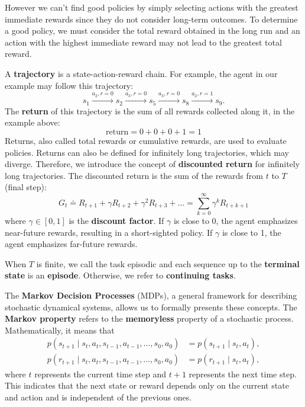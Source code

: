 However we can't find good policies
by simply selecting actions with the greatest immediate rewards
since they do not consider
long-term outcomes. To determine a good policy, we must consider the total
reward obtained in the long run and
an action with the highest immediate reward may not lead to
the greatest total reward.

A \textbf{trajectory} is a state-action-reward chain.
For example, the agent in our example may follow this trajectory:
\[ s_1 \xrightarrow{a_2, r=0} s_2 \xrightarrow{a_3, r=0} s_5 \xrightarrow{a_3, r=0} s_8 \xrightarrow{a_2, r=1} s_9. \]
The \textbf{return} of this trajectory is the sum of all rewards collected along it,
in the example above:
\[\text{return} = 0+0+0+1=1\]
Returns, also called total rewards or cumulative rewards,
are used to evaluate policies.
Returns can also be defined for infinitely long trajectories, which may diverge.
Therefore, we introduce the concept of \textbf{discounted return} for infinitely
long trajectories. The discounted return is the sum of the rewards from $t$ to $T$ (final step):
\begin{equation}
G_t \doteq R_{t+1} + \gamma R_{t+2} + \gamma^2 R_{t+3} + \ldots = \sum_{k=0}^{\infty} \gamma^k R_{t+k+1}
\end{equation}
where \( \gamma \in [0, 1] \) is the \textbf{discount factor}.
If \( \gamma \) is close to 0, the agent emphasizes near-future rewards,
resulting in a short-sighted policy. If \( \gamma \) is close to 1,
the agent emphasizes far-future rewards.

When $T$ is finite, we call the task episodic and each sequence
up to the \textbf{terminal state} is an \textbf{episode}. Otherwise, we refer
to \textbf{continuing tasks}.

The \textbf{Markov Decision Processes} (MDPs),
a general framework for describing stochastic dynamical systems,
allows us to formally presents these concepts.
The \textbf{Markov property} refers to the \textbf{memoryless} property of a stochastic process. Mathematically, it means that
\begin{equation}
\begin{aligned}
p(s_{t+1} \mid s_t, a_t, s_{t-1}, a_{t-1}, \ldots, s_0, a_0) &= p(s_{t+1} \mid s_t, a_t), \\
p(r_{t+1} \mid s_t, a_t, s_{t-1}, a_{t-1}, \ldots, s_0, a_0) &= p(r_{t+1} \mid s_t, a_t),
\end{aligned}
\end{equation}
where \( t \) represents the current time step and \( t + 1 \) represents the next time step.
This indicates that the next state or reward depends only on the current
state and action and is independent of the previous ones.

